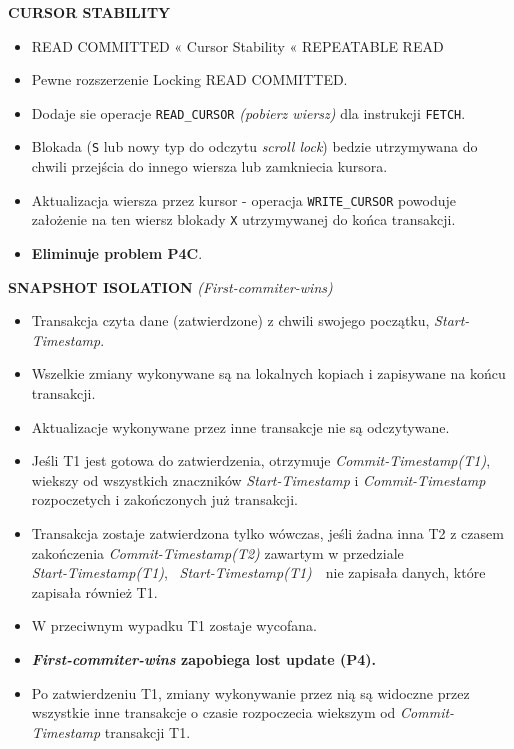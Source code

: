 \documentclass[a5paper,6pt]{article}
\begin{document}
    \textbf{CURSOR STABILITY}
    \begin{itemize}
        \item READ COMMITTED « Cursor Stability « REPEATABLE READ
        \item Pewne rozszerzenie Locking READ COMMITTED.
        \item Dodaje sie operacje \texttt{READ\_CURSOR}
              \textit{(pobierz wiersz)} dla instrukcji \texttt{FETCH}.
        \item Blokada (\texttt{S} lub nowy typ do odczytu \textit{scroll lock})
              bedzie utrzymywana do chwili przejścia do innego wiersza lub
              zamkniecia kursora.
        \item Aktualizacja wiersza przez kursor - operacja
              \texttt{WRITE\_CURSOR} powoduje założenie na ten wiersz blokady
              \texttt{X} utrzymywanej do końca transakcji.
        \item \textbf{Eliminuje problem P4C}.
    \end{itemize}

    \textbf{SNAPSHOT ISOLATION} \textit{(First-commiter-wins)}\\
    \begin{itemize}
        \item Transakcja czyta dane (zatwierdzone) z chwili swojego początku,
              \textit{Start-Timestamp}.
        \item Wszelkie zmiany wykonywane są na lokalnych kopiach i zapisywane
              na końcu transakcji.
        \item Aktualizacje wykonywane przez inne transakcje nie są odczytywane.
        \item Jeśli T1 jest gotowa do zatwierdzenia, otrzymuje
              \textit{Commit-Timestamp(T1)}, wiekszy od wszystkich znaczników
              \textit{Start-Timestamp} i \textit{Commit-Timestamp} rozpoczetych
              i zakończonych już transakcji.
        \item Transakcja zostaje zatwierdzona tylko wówczas, jeśli żadna inna T2
              z czasem zakończenia \textit{Commit-Timestamp(T2)} zawartym w
              przedziale\\
              \lbrack\textit{Start-Timestamp(T1)},~
              \textit{Start-Timestamp(T1)}\rbrack~~nie zapisała danych, które
              zapisała również T1.
        \item W przeciwnym wypadku T1 zostaje wycofana.
        \item \textbf{\textit{First-commiter-wins} zapobiega lost update (P4).}
        \item Po zatwierdzeniu T1, zmiany wykonywanie przez nią są widoczne
              przez wszystkie inne transakcje o czasie rozpoczecia wiekszym od
              \textit{Commit-Timestamp} transakcji T1.
    \end{itemize}
\end{document}
